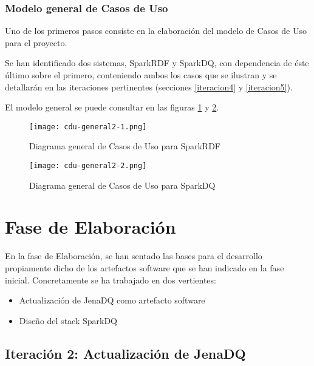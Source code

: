 \subsubsection{Modelo general de Casos de Uso}

Uno de los primeros pasos consiste en la elaboración del modelo de Casos de Uso
para el proyecto. 

Se han identificado dos sistemas, SparkRDF y SparkDQ, con dependencia de éste
último sobre el primero, conteniendo ambos los casos que se ilustran y se
detallarán en las iteraciones pertinentes (secciones \ref{iteracion4} y \ref{iteracion5}). 

El modelo general se puede consultar en las figuras \ref{fig:cdu-general1} y \ref{fig:cdu-general2}.

\begin{figure}[!h]
  \begin{center}
    \texttt{[image: cdu-general2-1.png]} 
    \caption{Diagrama general de Casos de Uso para SparkRDF}
    \label{fig:cdu-general1}
  \end{center}
\end{figure}

\begin{figure}[!h]
  \begin{center}
    \texttt{[image: cdu-general2-2.png]} 
    \caption{Diagrama general de Casos de Uso para SparkDQ}
    \label{fig:cdu-general2}
  \end{center}
\end{figure}



\section{Fase de Elaboración}

En la fase de Elaboración, se han sentado las bases para el desarrollo
propiamente dicho de los artefactos software que se han indicado en la fase
inicial. Concretamente se ha trabajado en dos vertientes:

\begin{itemize}
\item Actualización de JenaDQ como artefacto software
\item Diseño del stack SparkDQ
\end{itemize}

\subsection{Iteración 2: Actualización de JenaDQ}

